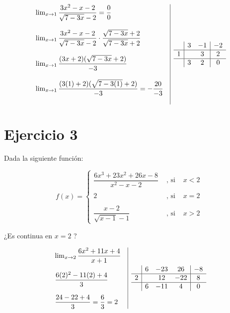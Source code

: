 \documentclass[12pt]{article}
\begin{document}
\[
\begin{array}{l|c}
  \begin{array}{l}
    \lim_{x \to 1} \dfrac{3x^2 - x - 2}{\sqrt{7-3x} - 2} = \dfrac{0}{0} \\\\
    \lim_{x \to 1} \dfrac{3x^2 - x - 2}{\sqrt{7-3x} - 2} \cdot \dfrac{\sqrt{7-3x} + 2}{\sqrt{7-3x} + 2} \\\\
    \lim_{x \to 1} \dfrac{(3x + 2)(\sqrt{7-3x} + 2)}{-3} \\\\
    \lim_{x \to 1} \dfrac{(3(1) + 2)(\sqrt{7-3(1)} + 2)}{-3} = -\dfrac{20}{-3} \\\\
  \end{array}
  &
  \begin{array}{c|c c|c}
    & 3 & -1 & -2 \\
    \hline
    1 &  & 3 & 2 \\
    \hline
    & 3 & 2 & 0 \\
  \end{array}
\end{array}
\]






\section*{Ejercicio 3}
\noindent Dada la siguiente función:

\[
f(x) = 
\left\{
  \begin{array}{cll}
    \dfrac{6x^3 + 23x^2 + 26x - 8}{x^2 - x -2} & \text{ , si } & x < 2 \\\\
    2 & \text{ , si } & x = 2 \\\\
    \dfrac{x-2}{\sqrt{x-1} - 1} & \text{ , si } & x > 2
  \end{array}
\right.
\]

\noindent ¿Es continua en $x=2$ ?

\[
\begin{array}{l|c}
  \begin{array}{l}
    \lim_{x \to 2} \dfrac{6x^2 + 11x + 4}{x + 1} \\\\
    \dfrac{6(2)^2 - 11(2) + 4}{3} \\\\
    \dfrac{24 - 22 + 4}{3} = \dfrac{6}{3} = 2
  \end{array}
  &
  \begin{array}{c|c c c|c}
    & 6 & -23 & 26 & -8 \\
    \hline
    2 &  & 12 & -22 & 8 \\
    \hline
    & 6 & -11 & 4 & 0 \\
  \end{array}
\end{array}
\]
\end{document}
